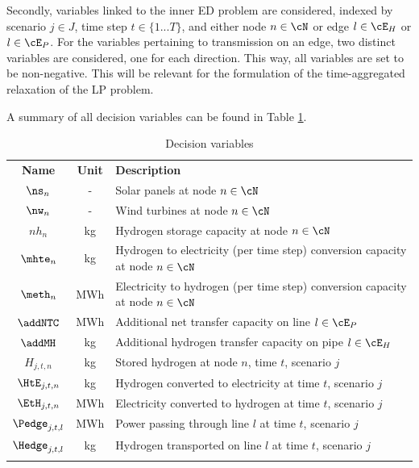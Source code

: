 \documentclass[smallextended,natbib]{svjour3}       %
\numberwithin{definition}{section}
\numberwithin{theorem}{section}
\numberwithin{proposition}{section}
\begin{document}
Secondly, variables linked to the inner ED problem are considered, indexed by scenario \(j\in J\), time step \(t\in\{1...T\}\), and either node \(n \in \cN\) or edge $l\in\cE_H$ or $l \in \cE_P$. 
For the variables pertaining to transmission on an edge, two distinct variables are considered, one for each direction. 
This way, all variables are set to be non-negative. This will be relevant for the formulation of the time-aggregated relaxation of the LP problem.

A summary of all decision variables can be found in Table \ref{table_vars}.

\begin{table}
  \caption{Decision variables}
  \label{table_vars}
  \begin{tabularx}{\textwidth}{ccl}
  \hline\noalign{\smallskip}
  \textbf{Name} & \textbf{Unit} & \textbf{Description}  \\
  \noalign{\smallskip}\hline\noalign{\smallskip}
  $\ns_n$ & - & Solar panels at node $n \in \cN$ \\
  $\nw_n$ & - & Wind turbines at node $n \in \cN$ \\
  $nh_n$ & kg & Hydrogen storage capacity at node $n \in \cN$\\
  $\mhte_n$ & kg & \parbox[t]{0.70\textwidth}{Hydrogen to electricity (per time step) conversion capacity at node $n \in \cN$} \\
  $\meth_n$ & MWh &  \parbox[t]{0.70\textwidth}{Electricity to hydrogen (per time step) conversion capacity at node $n \in \cN$} \\
  $\addNTC$ & MWh & Additional net transfer capacity on line $l\in\cE_P$\\
  $\addMH$ & kg & Additional hydrogen transfer capacity on pipe $l\in\cE_H$\\
  \noalign{\smallskip}\hline\noalign{\smallskip}
  $H_{j,t,n}$ & kg& Stored hydrogen at node $n$, time \(t\), scenario \(j\)\\
  $\HtE_{j,t,n}$ & kg& Hydrogen converted to electricity at time \(t\), scenario \(j\) \\
  $\EtH_{j,t,n}$ & MWh& Electricity converted to hydrogen at time \(t\), scenario \(j\)\\
  $\Pedge_{j,t,l}$&MWh& Power passing through line $l$ at time $t$, scenario $j$ \\
  $\Hedge_{j,t,l}$&kg& Hydrogen transported on line $l$ at time $t$, scenario $j$\\
  \noalign{\smallskip}\hline
  \end{tabularx}
  \end{table}
  
\end{document}
